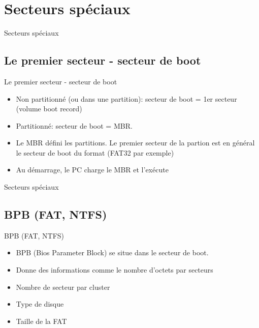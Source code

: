 \def\sectitle{Secteurs spéciaux}
\section{\sectitle}
\begin{frame}{\sectitle}
\def\subsectitle{Le premier secteur - secteur de boot}
\subsection{\subsectitle}
\begin{block}{\subsectitle}
\begin{itemize}
    \item Non partitionné (ou dans une partition): secteur de boot = 1er secteur (volume boot record)
    \item Partitionné: secteur de boot = MBR.
    \item Le MBR défini les partitions. Le premier secteur de la partion est en
        général le secteur de boot du format (FAT32 par exemple)
    \item Au démarrage, le PC charge le MBR et l'exécute
\end{itemize}
\end{block}
\end{frame}




\begin{frame}{\sectitle}
\def\subsectitle{BPB (FAT, NTFS)}
\subsection{\subsectitle}
\begin{block}{\subsectitle}
\begin{itemize}
    \item BPB (Bios Parameter Block) se situe dans le secteur de boot.
    \item Donne des informations comme le nombre d'octets par secteurs
    \item Nombre de secteur par cluster
    \item Type de disque
    \item Taille de la FAT
\end{itemize}
\end{block}
\end{frame}


\def\sectitle{Divers}
